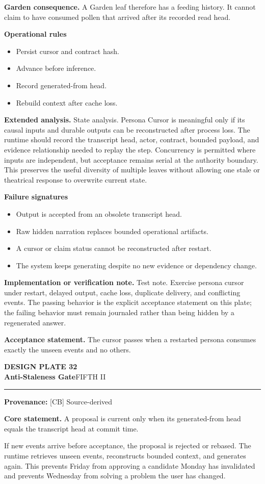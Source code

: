 \documentclass[10pt,letterpaper,oneside]{article}
\newcommand{\prov}[1]{\textcolor{gardenBlue}{\sffamily\footnotesize\textbf{Provenance:} #1}}
\newcommand{\platetitle}[3]{%
  \begin{minipage}[t][0.54in][t]{\textwidth}
  {\sffamily\bfseries\color{gardenDeep}\fontsize{9}{10}\selectfont DESIGN PLATE #1}\\[-1pt]
  {\sffamily\bfseries\color{gardenInk}\fontsize{16.5}{18}\selectfont #2}\hfill{\sffamily\color{gardenGreen}\large #3}
  \end{minipage}\vspace{-2pt}\hrule\vspace{5pt}}
\begin{document}
\textbf{Garden consequence.} A Garden leaf therefore has a feeding history. It cannot claim to have consumed pollen that arrived after its recorded read head.

\textbf{Operational rules}
\begin{itemize}
\item Persist cursor and contract hash.
\item Advance before inference.
\item Record generated-from head.
\item Rebuild context after cache loss.
\end{itemize}
\textbf{Extended analysis.} State analysis. Persona Cursor is meaningful only if its causal inputs and durable outputs can be reconstructed after process loss. The runtime should record the transcript head, actor, contract, bounded payload, and evidence relationship needed to replay the step. Concurrency is permitted where inputs are independent, but acceptance remains serial at the authority boundary. This preserves the useful diversity of multiple leaves without allowing one stale or theatrical response to overwrite current state.

\textbf{Failure signatures}
\begin{itemize}
\item Output is accepted from an obsolete transcript head.
\item Raw hidden narration replaces bounded operational artifacts.
\item A cursor or claim status cannot be reconstructed after restart.
\item The system keeps generating despite no new evidence or dependency change.
\end{itemize}
\textbf{Implementation or verification note.} Test note. Exercise persona cursor under restart, delayed output, cache loss, duplicate delivery, and conflicting events. The passing behavior is the explicit acceptance statement on this plate; the failing behavior must remain journaled rather than being hidden by a regenerated answer.

\begin{acceptbox}
\textbf{Acceptance statement.} The cursor passes when a restarted persona consumes exactly the unseen events and no others.
\end{acceptbox}
\newpage
\platetitle{32}{Anti-Staleness Gate}{FIFTH II}
\prov{[CB] Source-derived}
\fontsize{8.85}{10.45}\selectfont
\begin{corebox}
\textbf{Core statement.} A proposal is current only when its generated-from head equals the transcript head at commit time.
\end{corebox}
If new events arrive before acceptance, the proposal is rejected or rebased. The runtime retrieves unseen events, reconstructs bounded context, and generates again. This prevents Friday from approving a candidate Monday has invalidated and prevents Wednesday from solving a problem the user has changed.
\end{document}
